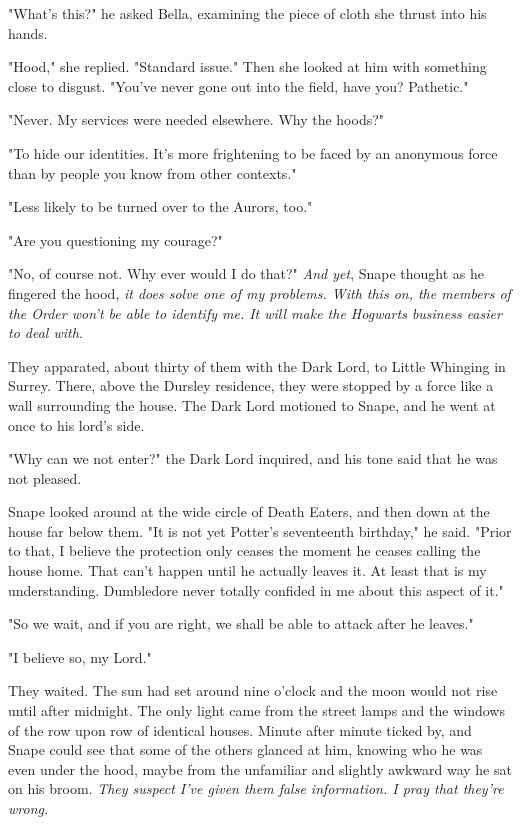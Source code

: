 "What's this?" he asked Bella, examining the piece of cloth she thrust into his hands.

"Hood," she replied. "Standard issue." Then she looked at him with something close to disgust. "You've never gone out into the field, have you? Pathetic."

"Never. My services were needed elsewhere. Why the hoods?"

"To hide our identities. It's more frightening to be faced by an anonymous force than by people you know from other contexts."

"Less likely to be turned over to the Aurors, too."

"Are you questioning my courage?"

"No, of course not. Why ever would I do that?" \emph{And yet}, Snape thought as he fingered the hood, \emph{it does solve one of my problems. With this on, the members of the Order won't be able to identify me. It will make the Hogwarts business easier to deal with.}

They apparated, about thirty of them with the Dark Lord, to Little Whinging in Surrey. There, above the Dursley residence, they were stopped by a force like a wall surrounding the house. The Dark Lord motioned to Snape, and he went at once to his lord's side.

"Why can we not enter?" the Dark Lord inquired, and his tone said that he was not pleased.

Snape looked around at the wide circle of Death Eaters, and then down at the house far below them. "It is not yet Potter's seventeenth birthday," he said. "Prior to that, I believe the protection only ceases the moment he ceases calling the house home. That can't happen until he actually leaves it. At least that is my understanding. Dumbledore never totally confided in me about this aspect of it."

"So we wait, and if you are right, we shall be able to attack after he leaves."

"I believe so, my Lord."

They waited. The sun had set around nine o'clock and the moon would not rise until after midnight. The only light came from the street lamps and the windows of the row upon row of identical houses. Minute after minute ticked by, and Snape could see that some of the others glanced at him, knowing who he was even under the hood, maybe from the unfamiliar and slightly awkward way he sat on his broom. \emph{They suspect I've given them false information. I pray that they're wrong.}

